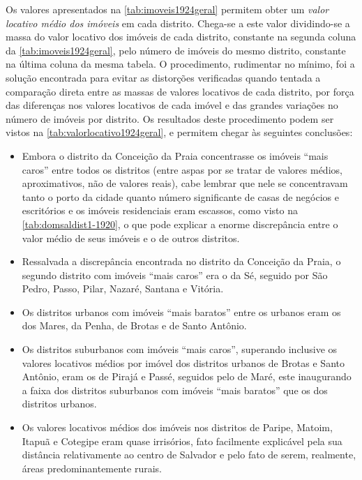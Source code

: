 Os valores apresentados na \autoref{tab:imoveis1924geral} permitem obter um \textit{valor locativo médio dos imóveis} em cada distrito. Chega-se a este valor dividindo-se a massa do valor locativo dos imóveis de cada distrito, constante na segunda coluna da \autoref{tab:imoveis1924geral}, pelo número de imóveis do mesmo distrito, constante na última coluna da mesma tabela. O procedimento, rudimentar no mínimo, foi a solução encontrada para evitar as distorções verificadas quando tentada a comparação direta entre as massas de valores locativos de cada distrito, por força das diferenças nos valores locativos de cada imóvel e das grandes variações no número de imóveis por distrito. Os resultados deste procedimento podem ser vistos na \autoref{tab:valorlocativo1924geral}, e permitem chegar às seguintes conclusões:



\begin{itemize}
\item Embora o distrito da Conceição da Praia concentrasse os imóveis ``mais caros'' entre todos os distritos (entre aspas por se tratar de valores médios, aproximativos, não de valores reais), cabe lembrar que nele se concentravam tanto o porto da cidade quanto número significante de casas de negócios e escritórios e os imóveis residenciais eram escassos, como visto na \autoref{tab:domsaldist1-1920}, o que pode explicar a enorme discrepância entre o valor médio de seus imóveis e o de outros distritos.
\item Ressalvada a discrepância encontrada no distrito da Conceição da Praia, o segundo distrito com imóveis ``mais caros'' era o da Sé, seguido por São Pedro, Passo, Pilar, Nazaré, Santana e Vitória.
\item Os distritos urbanos com imóveis ``mais baratos'' entre os urbanos eram os dos Mares, da Penha, de Brotas e de Santo Antônio.
\item Os distritos suburbanos com imóveis ``mais caros'', superando inclusive os valores locativos médios por imóvel dos distritos urbanos de Brotas e Santo Antônio, eram os de Pirajá e Passé, seguidos pelo de Maré, este inaugurando a faixa dos distritos suburbanos com imóveis ``mais baratos'' que os dos distritos urbanos.
\item Os valores locativos médios dos imóveis nos distritos de Paripe, Matoim, Itapuã e Cotegipe eram quase irrisórios, fato facilmente explicável pela sua distância relativamente ao centro de Salvador e pelo fato de serem, realmente, áreas predominantemente rurais.
\end{itemize}

